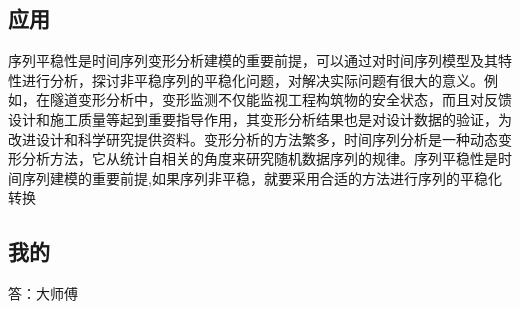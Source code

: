 \documentclass[12pt, a4paper]{ctexart}
\begin{document}
\begin{flushleft}
\subsection{应用}


序列平稳性是时间序列变形分析建模的重要前提，可以通过对时间序列模型及其特性进行分析，探讨非平稳序列的平稳化问题，对解决实际问题有很大的意义。例如，在隧道变形分析中，变形监测不仅能监视工程构筑物的安全状态，而且对反馈设计和施工质量等起到重要指导作用，其变形分析结果也是对设计数据的验证，为改进设计和科学研究提供资料。变形分析的方法繁多，时间序列分析是一种动态变形分析方法，它从统计自相关的角度来研究随机数据序列的规律。序列平稳性是时间序列建模的重要前提,如果序列非平稳，就要采用合适的方法进行序列的平稳化转换
\subsection{我的}
\qquad 答：大师傅






\end{flushleft}
\end{document}
